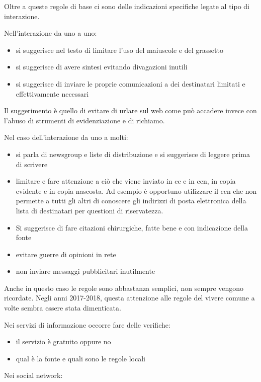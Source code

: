 Oltre a queste regole di base ci sono delle indicazioni specifiche legate al tipo di interazione.

Nell'interazione da uno a uno:
\begin{itemize}
    \item si suggerisce nel testo di limitare l'uso del maiuscole e del grassetto
    \item si suggerisce di avere sintesi evitando divagazioni inutili
    \item si suggerisce di inviare le proprie comunicazioni a dei destinatari limitati e effettivamente necessari
\end{itemize}

Il suggerimento è quello di evitare di urlare sul web come può accadere invece con l'abuso di strumenti di evidenziazione e di richiamo.

Nel caso dell'interazione da uno a molti:
\begin{itemize}
    \item si parla di newsgroup e liste di distribuzione e si suggerisce di leggere prima di scrivere
    \item limitare e fare attenzione a ciò che viene inviato in cc e in ccn, in copia evidente e in copia nascosta. Ad esempio è opportuno utilizzare il ccn che non permette a tutti gli altri di conoscere gli indirizzi di posta elettronica della lista di destinatari per questioni di riservatezza.
    \item Si suggerisce di fare citazioni chirurgiche, fatte bene e con indicazione della fonte
    \item evitare guerre di opinioni in rete
    \item non inviare messaggi pubblicitari inutilmente
\end{itemize}

Anche in questo caso le regole sono abbastanza semplici, non sempre vengono ricordate. Negli anni 2017-2018, questa attenzione alle regole del vivere comune a volte sembra essere stata dimenticata.

Nei servizi di informazione occorre fare delle verifiche:

\begin{itemize}
    \item il servizio è gratuito oppure no
    \item qual è la fonte e quali sono le regole locali
\end{itemize}
\par
Nei social network:

